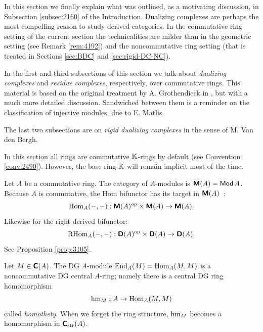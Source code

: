 


\renewcommand{\thisfile}{block4\_190328}
 
\cleardoublepage 
{} 
\label{sec:dual-cplx-comm-rng} 

\AYcopyright 

In this section we finally explain what was outlined, as a motivating 
discussion, in Subsection \ref{subsec:2160} of the Introduction. Dualizing 
complexes are perhaps the most compelling reason to study derived categories. In 
the commutative ring setting of the current section the technicalities are 
milder than in the geometric setting (see Remark \ref{rem:4192}) and the 
noncommutative ring setting (that is treated in Sections \ref{sec:BDC} and 
\ref{sec:rigid-DC-NC}). 

In the first and third subsections of this section we talk about {\em dualizing 
complexes} and {\em residue complexes}, respectively, over commutative rings. 
This material is based on the original treatment by A. Grothendieck in 
\cite{RD}, but with a much more detailed discussion. Sandwiched between them is 
a reminder on the  classification of injective modules, due to E. Matlis. 

The last two subsections are on {\em rigid dualizing complexes} in the sense of 
M. Van den Bergh. 

In this section all rings are commutative $\mathbb{K}$-rings by default (see 
Convention \ref{conv:2490}). However, the base ring $\mathbb{K}$ will remain implicit 
most of the time. 


 \label{subsec:du-cplxs}

Let $A$ be a commutative ring. The category of $A$-modules is 
$\boldsymbol{\mathsf{M}}(A) = \operatorname{\mathsf{Mod}} A$. Because $A$ is 
commutative, the Hom bifunctor has its target in $\boldsymbol{\mathsf{M}}(A)$~: 
\[ \operatorname{Hom}_A(-,-) : \boldsymbol{\mathsf{M}}(A)^{\mathrm{op}} \times \boldsymbol{\mathsf{M}}(A)
\to \boldsymbol{\mathsf{M}}(A) . \]
Likewise for the right derived bifunctor: 
\[ \operatorname{RHom}_A(-,-) : \boldsymbol{\mathsf{D}}(A)^{\mathrm{op}} \times \boldsymbol{\mathsf{D}}(A)
\to \boldsymbol{\mathsf{D}}(A) . \]
See Proposition \ref{prop:3105}.

Let $M \in \boldsymbol{\mathsf{C}}(A)$. The DG $A$-module 
$\operatorname{End}_A(M) = \operatorname{Hom}_A(M, M)$ 
is a noncommutative DG central $A$-ring; namely there is a central DG ring 
homomorphism 
\begin{equation} \label{eqn:2390}
\operatorname{hm}_{M} : A \to \operatorname{Hom}_A(M, M) 
\end{equation}
called {\em homothety}. 
When we forget the ring structure, $\operatorname{hm}_{M}$ becomes a homomorphism in
$\boldsymbol{\mathsf{C}}_{\mathrm{str}}(A)$. 

